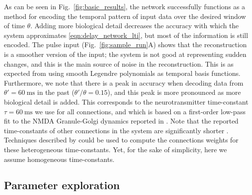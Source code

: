 As can be seen in Fig.~\ref{fig:basic_results}, the network successfully functions as a method for encoding the temporal pattern of input data over the desired window of time $\theta$.
Adding more biological detail decreases the accuracy with which the system approximates \cref{eqn:delay_network_lti}, but most of the information is still encoded.
The pulse input (Fig.~\ref{fig:sample_run}A) shows that the reconstruction is a smoother version of the input; the system is not good at representing sudden changes, and this is the main source of noise in the reconstruction.  This is as expected from using smooth Legendre polynomials as temporal basis functions. Furthermore, we note that there is a peak in accuracy when decoding data from $\theta' = \SI{60}{\milli\second}$ in the past ($\theta'/\theta=0.15$), and this peak is more pronounced as more biological detail is added. This corresponds to the neurotransmitter time-constant $\tau = \SI{60}{\milli\second}$ we use for all connections, and which is based on a first-order low-pass fit to the NMDA Granule-Golgi dynamics reported in \citet{dieudonne1998submillisecond}. Note that the reported time-constants of other connections in the system are significantly shorter \cite{kanichay2008synaptic}. Techniques described by \cite{voelker2018improving} could be used to compute the connections weights for these heterogeneous time-constants. Yet, for the sake of simplicity, here we assume homogeneous time-constants.

\subsection{Parameter exploration}

